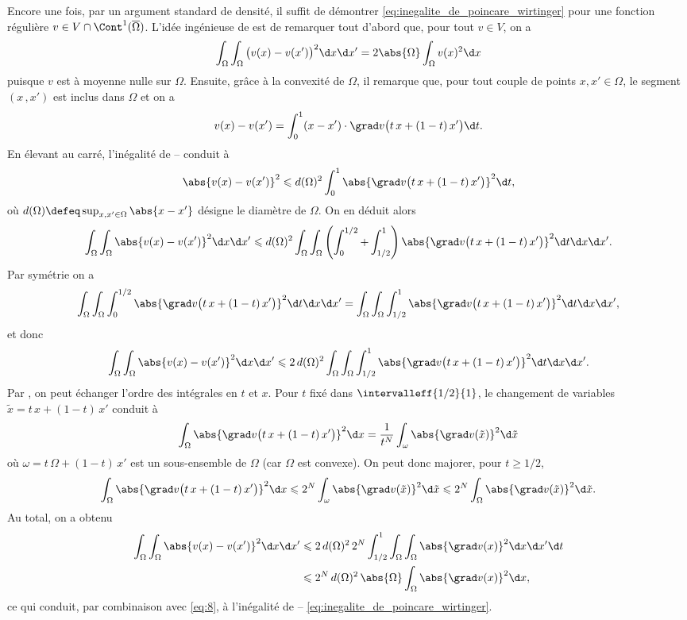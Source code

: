 \begin{demo}
Encore une fois, par un argument standard de densité, il suffit de démontrer \ref{eq:inegalite_de_poincare_wirtinger} pour une fonction régulière $v \in V \cap \Cont^1(\overline{\Omega})$. L'idée ingénieuse de  est de remarquer tout d'abord que, pour tout $v \in V$, on a
\begin{equation}\label{eq:8}
\int_\Omega \int_\Omega \big(v(x) - v(x')\big)^2 \d x \d x' = 2 \abs{\Omega} \int_\Omega v(x)^2 \d x
\end{equation}
puisque $v$ est à moyenne nulle sur $\Omega$. Ensuite, grâce à la convexité de $\Omega$, il remarque que, pour tout couple de points $x, x' \in \Omega$, le segment $(x\,, x')$ est inclus dans $\Omega$ et on a
\[
v(x) - v(x') = \int_0^1 (x - x') \cdot \grad v \big(t\,x + (1-t)\,x'\big) \d t.
\]
En élevant au carré, l'inégalité de -- conduit à
\[
\abs{v(x) - v(x')}^2 \leqslant d(\Omega)^2 \int_0^1 \abs{\grad v \big(t\,x + (1-t)\,x'\big)}^2 \d t,
\]
où $d(\Omega) \defeq \sup_{x, x' \in \Omega} \abs{x - x'}$ désigne le diamètre de $\Omega$. On en déduit alors
\[
\int_\Omega \int_\Omega \abs{v(x) - v(x')}^2 \d x \d x'
\leqslant d(\Omega)^2 \int_\Omega \int_\Omega \left( \int_0^{1/2} + \int_{1/2}^1 \right) \abs{\grad v \big(t\,x + (1-t)\,x'\big)}^2 \d t \d x \d x'.
\]
Par symétrie on a
\[
\int_\Omega \int_\Omega \int_0^{1/2} \abs{\grad v \big(t\,x + (1-t)\,x'\big)}^2 \d t \d x \d x'
 = \int_\Omega \int_\Omega \int_{1/2}^1 \abs{\grad v \big(t\,x + (1-t)\,x'\big)}^2 \d t \d x \d x',
\]
et donc
\[
\int_\Omega \int_\Omega \abs{v(x) - v(x')}^2 \d x \d x' \leqslant 2 \, d(\Omega)^2 \int_\Omega \int_\Omega \int_{1/2}^1 \abs{\grad v \big(t\,x + (1-t)\,x'\big)}^2 \d t \d x \d x'.
\]
Par , on peut échanger l'ordre des intégrales en $t$ et $x$.  Pour $t$ fixé dans $\intervalleff{1/2}{1}$, le changement de variables $\tilde{x} = t\,x + (1-t)\, x'$ conduit à
\[
\int_\Omega \abs{\grad v \big(t\,x + (1-t)\,x'\big)}^2 \d x = \frac{1}{t^N} \int_\omega \abs{\grad v(\tilde{x})}^2 \d \tilde{x}
\]
où $\omega = t\, \Omega + (1 - t) \, x'$ est un sous-ensemble de $\Omega$ (car $\Omega$ est convexe). On peut donc majorer, pour $t \geqslant 1/2$,
\[
\int_\Omega \abs{\grad v \big(t\,x + (1-t)\,x'\big)}^2 \d x
\leqslant
2^N \int_\omega \abs{\grad v(\tilde{x})}^2 \d \tilde{x}
\leqslant
2^N \int_\Omega \abs{\grad v(\tilde{x})}^2 \d \tilde{x}.
\]
Au total, on a obtenu
\begin{align*}
\int_\Omega \int_\Omega \abs{v(x) - v(x')}^2 \d x \d x'
&\leqslant 2 \, d(\Omega)^2 \, 2^N \int_{1/2}^1 \int_\Omega \int_\Omega \abs{\grad v(x)}^2 \d x \d x' \d t \\
&\leqslant 2^N \, d(\Omega)^2 \, \abs{\Omega} \int_\Omega \abs{\grad v(x)}^2 \d x,
\end{align*}
ce qui conduit, par combinaison avec \ref{eq:8}, à l'inégalité de -- \ref{eq:inegalite_de_poincare_wirtinger}.
\end{demo}


